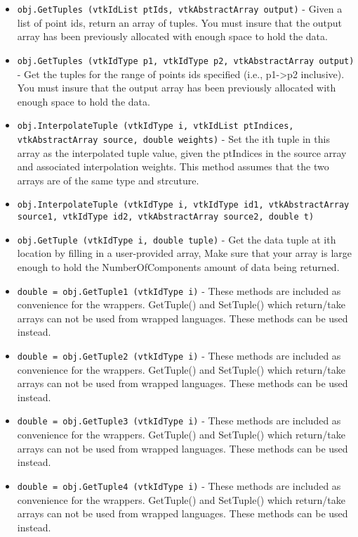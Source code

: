 \begin{itemize}
\item  \verb|obj.GetTuples (vtkIdList ptIds, vtkAbstractArray output)| -  Given a list of point ids, return an array of tuples.
 You must insure that the output array has been previously 
 allocated with enough space to hold the data.

\item  \verb|obj.GetTuples (vtkIdType p1, vtkIdType p2, vtkAbstractArray output)| -  Get the tuples for the range of points ids specified 
 (i.e., p1->p2 inclusive). You must insure that the output array has 
 been previously allocated with enough space to hold the data.

\item  \verb|obj.InterpolateTuple (vtkIdType i, vtkIdList ptIndices, vtkAbstractArray source, double weights)| -  Set the ith tuple in this array as the interpolated tuple value,
 given the ptIndices in the source array and associated 
 interpolation weights.
 This method assumes that the two arrays are of the same type
 and strcuture.

\item  \verb|obj.InterpolateTuple (vtkIdType i, vtkIdType id1, vtkAbstractArray source1, vtkIdType id2, vtkAbstractArray source2, double t)|

\item  \verb|obj.GetTuple (vtkIdType i, double tuple)| -  Get the data tuple at ith location by filling in a user-provided array,
 Make sure that your array is large enough to hold the NumberOfComponents
 amount of data being returned.

\item  \verb|double = obj.GetTuple1 (vtkIdType i)| -  These methods are included as convenience for the wrappers.
 GetTuple() and SetTuple() which return/take arrays can not be 
 used from wrapped languages. These methods can be used instead.

\item  \verb|double = obj.GetTuple2 (vtkIdType i)| -  These methods are included as convenience for the wrappers.
 GetTuple() and SetTuple() which return/take arrays can not be 
 used from wrapped languages. These methods can be used instead.

\item  \verb|double = obj.GetTuple3 (vtkIdType i)| -  These methods are included as convenience for the wrappers.
 GetTuple() and SetTuple() which return/take arrays can not be 
 used from wrapped languages. These methods can be used instead.

\item  \verb|double = obj.GetTuple4 (vtkIdType i)| -  These methods are included as convenience for the wrappers.
 GetTuple() and SetTuple() which return/take arrays can not be 
 used from wrapped languages. These methods can be used instead.


\end{itemize}

